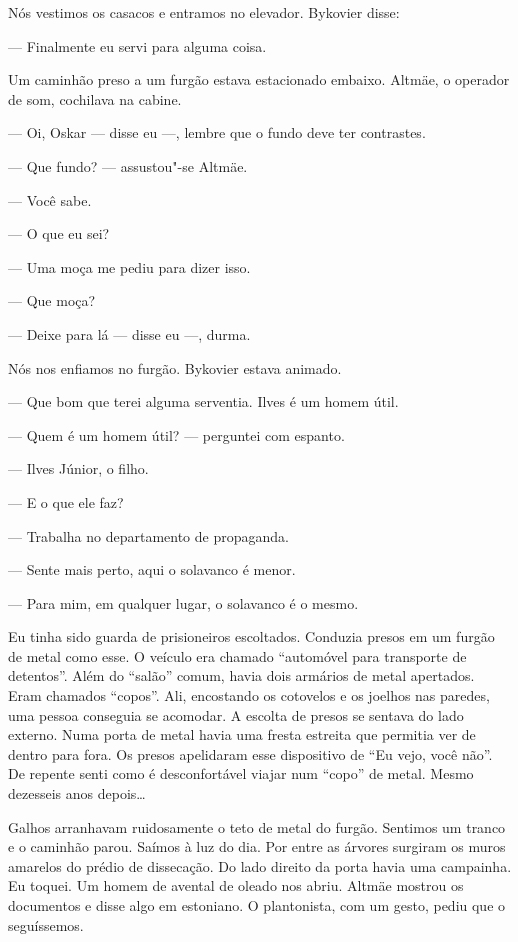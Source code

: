Nós vestimos os casacos e entramos no elevador. Bykovier disse:

--- Finalmente eu servi para alguma coisa.

Um caminhão preso a um furgão estava estacionado embaixo. Altmäe, o
operador de som, cochilava na cabine.

--- Oi, Oskar --- disse eu ---, lembre que o fundo deve ter contrastes.

--- Que fundo? --- assustou"-se Altmäe.

--- Você sabe.

--- O que eu sei?

--- Uma moça me pediu para dizer isso.

--- Que moça?

--- Deixe para lá --- disse eu ---, durma.

Nós nos enfiamos no furgão. Bykovier estava animado.

--- Que bom que terei alguma serventia. Ilves é um homem útil.

--- Quem é um homem útil? --- perguntei com espanto.

--- Ilves Júnior, o filho.

--- E o que ele faz?

--- Trabalha no departamento de propaganda.

--- Sente mais perto, aqui o solavanco é menor.

--- Para mim, em qualquer lugar, o solavanco é o mesmo.

Eu tinha sido guarda de prisioneiros escoltados. Conduzia presos em um
furgão de metal como esse. O veículo era chamado ``automóvel para
transporte de detentos''. Além do ``salão'' comum, havia dois armários
de metal apertados. Eram chamados ``copos''. Ali, encostando os
cotovelos e os joelhos nas paredes, uma pessoa conseguia se acomodar. A
escolta de presos se sentava do lado externo. Numa porta de metal havia
uma fresta estreita que permitia ver de dentro para fora. Os presos
apelidaram esse dispositivo de ``Eu vejo, você não''. De repente senti
como é desconfortável viajar num ``copo'' de metal. Mesmo dezesseis anos
depois\ldots{}

Galhos arranhavam ruidosamente o teto de metal do furgão. Sentimos um
tranco e o caminhão parou. Saímos à luz do dia. Por entre as árvores
surgiram os muros amarelos do prédio de dissecação. Do lado direito da
porta havia uma campainha. Eu toquei. Um homem de avental de oleado nos
abriu. Altmäe mostrou os documentos e disse algo em estoniano. O
plantonista, com um gesto, pediu que o seguíssemos.

